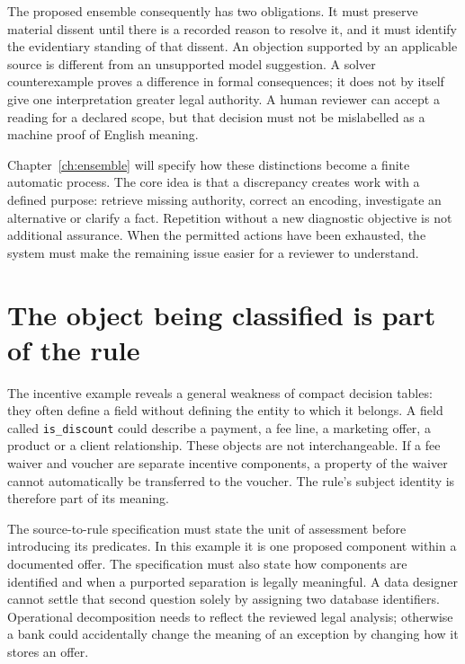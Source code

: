 \documentclass[12pt,a4paper,oneside,openany]{book}
\begin{document}
The proposed ensemble consequently has two obligations. It must preserve
material dissent until there is a recorded reason to resolve it, and it must
identify the evidentiary standing of that dissent. An objection supported by an
applicable source is different from an unsupported model suggestion. A solver
counterexample proves a difference in formal consequences; it does not by itself
give one interpretation greater legal authority. A human reviewer can accept a
reading for a declared scope, but that decision must not be mislabelled as a
machine proof of English meaning.

Chapter~\ref{ch:ensemble} will specify how these distinctions become a finite
automatic process. The core idea is that a discrepancy creates work with a
defined purpose: retrieve missing authority, correct an encoding, investigate an
alternative or clarify a fact. Repetition without a new diagnostic objective is
not additional assurance. When the permitted actions have been exhausted, the
system must make the remaining issue easier for a reviewer to understand.

\section{The object being classified is part of the rule}
\label{merge:M01:05}

\label{sec:problem-objects}
The incentive example reveals a general weakness of compact decision tables:
they often define a field without defining the entity to which it belongs. A
field called \texttt{is\_discount} could describe a payment, a fee line, a
marketing offer, a product or a client relationship. These objects are not
interchangeable. If a fee waiver and voucher are separate incentive components,
a property of the waiver cannot automatically be transferred to the voucher.
The rule's subject identity is therefore part of its meaning.

The source-to-rule specification must state the unit of assessment before
introducing its predicates. In this example it is one proposed component within
a documented offer. The specification must also state how components are
identified and when a purported separation is legally meaningful. A data
designer cannot settle that second question solely by assigning two database
identifiers. Operational decomposition needs to reflect the reviewed legal
analysis; otherwise a bank could accidentally change the meaning of an exception
by changing how it stores an offer.
\end{document}
